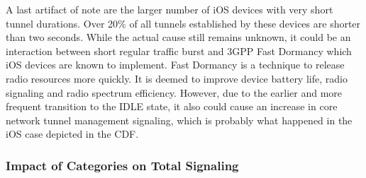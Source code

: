 A last artifact of note are the larger number of iOS devices with very short tunnel durations. Over 20\% of all tunnels established by these devices are shorter than two seconds. While the actual cause still remains unknown, it could be an interaction between short regular traffic burst and 3GPP Fast Dormancy \cite{gsma2011fdbestpract} which iOS devices are known to implement. Fast Dormancy is a technique to release radio resources more quickly. It is deemed to improve device battery life, radio signaling and radio spectrum efficiency. However, due to the earlier and more frequent transition to the IDLE state, it also could cause an increase in core network tunnel management signaling, which is probably what happened in the iOS case depicted in the CDF.





\subsubsection{Impact of Categories on Total Signaling}


